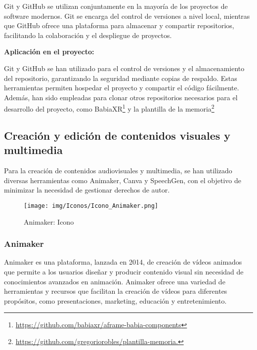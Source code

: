 \documentclass[a4paper, 12pt]{book}
\begin{document}
        Git y GitHub se utilizan conjuntamente en la mayoría de los proyectos de software modernos. Git se encarga del control de versiones a nivel local, mientras que GitHub ofrece una plataforma para almacenar y compartir repositorios, facilitando la colaboración y el despliegue de proyectos. 
        
        \vspace{0.5cm} %
        \textbf{Aplicación en el proyecto:} 
        
       Git y GitHub se han utilizado para el control de versiones y el almacenamiento del repositorio, garantizando la seguridad mediante copias de respaldo. Estas herramientas permiten hospedar el proyecto y compartir el código fácilmente. Además, han sido empleadas para clonar otros repositorios necesarios para el desarrollo del proyecto, como BabiaXR\footnote{\url{https://github.com/babiaxr/aframe-babia-components}} y la plantilla de la memoria\footnote{\url{https://github.com/gregoriorobles/plantilla-memoria.}}
        
    
    
    
    
    
    \subsection{Creación y edición de contenidos visuales y multimedia}
    
    Para la creación de contenidos audiovisuales y multimedia, se han utilizado diversas herramientas como Animaker, Canva y SpeechGen, con el objetivo de minimizar la necesidad de gestionar derechos de autor.
    
        \begin{figure}[H]
            \centering
            \texttt{[image: img/Iconos/Icono\_Animaker.png]}
            \caption{Animaker: Icono}
            \label{fig:enter-label}
         \end{figure}     
        \subsubsection{Animaker}
    
    Animaker es una plataforma, lanzada en 2014, de creación de vídeos animados que permite a los usuarios diseñar y producir contenido visual sin necesidad de conocimientos avanzados en animación. Animaker ofrece una variedad de herramientas y recursos que facilitan la creación de vídeos para diferentes propósitos, como presentaciones, marketing, educación y entretenimiento.
    
\end{document}
